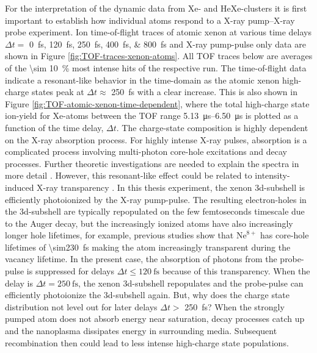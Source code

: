 For the interpretation of the dynamic data from Xe- and HeXe-clusters it is first important to establish how individual atoms respond to a X-ray pump--X-ray probe experiment. Ion time-of-flight traces of atomic xenon at various time delays $\Delta t =$ \SIlist{0;120;250;400;800}{\femto\second} and X-ray pump-pulse only data are shown in Figure \ref{fig:TOF-traces-xenon-atoms}. All TOF traces below are averages of the \SI{\sim 10}{\percent} most intense hits of the respective run. The time-of-flight data indicate a resonant-like behavior in the time-domain as the atomic xenon high-charge states peak at $\Delta t\approx$ \SI{250}{\femto\second} with a clear increase. This is also shown in Figure \ref{fig:TOF-atomic-xenon-time-dependent}, where the total high-charge state ion-yield for Xe-atoms between the TOF range \SIrange{5.13}{6.50}{\micro\second} is plotted as a function of the time delay, $\Delta t$. The charge-state composition is highly dependent on the X-ray absorption process. For highly intense X-ray pulses, absorption is a complicated process involving multi-photon core-hole excitations and decay processes. Further theoretic investigations are needed to explain the spectra in more detail \cite{Ho-2014-PRL,Ho-2016-PC}. However, this resonant-like effect could be related to intensity-induced X-ray transparency \cite{Young-2010-Nature,Schorb-2012-PRL}. In this thesis experiment, the xenon 3d-subshell is efficiently photoionized by the X-ray pump-pulse. The resulting electron-holes in the 3d-subshell are typically repopulated on the few femtoseconds timescale due to the Auger decay, but the increasingly ionized atoms have also increasingly longer hole lifetimes, for example, previous studies show that $\text{Ne}^{8+}$ has core-hole lifetimes of \SI{\sim230}{\femto\second} \cite{Young-2010-Nature} making the atom increasingly transparent during the vacancy lifetime. In the present case, the absorption of photons from the probe-pulse is suppressed for delays $\Delta t \leq \SI{120}{\femto\second}$ because of this transparency. When the delay is $\Delta t = \SI{250}{\femto\second}$, the xenon 3d-subshell repopulates and the probe-pulse can efficiently photoionize the 3d-subshell again. But, why does the charge state distribution not level out for later delays $\Delta t >$ \SI{250}{\femto\second}? When the strongly pumped atom does not absorb energy near saturation, decay processes catch up and the nanoplasma dissipates energy in surrounding media. Subsequent recombination then could lead to less intense high-charge state populations.\\[1\baselineskip]
